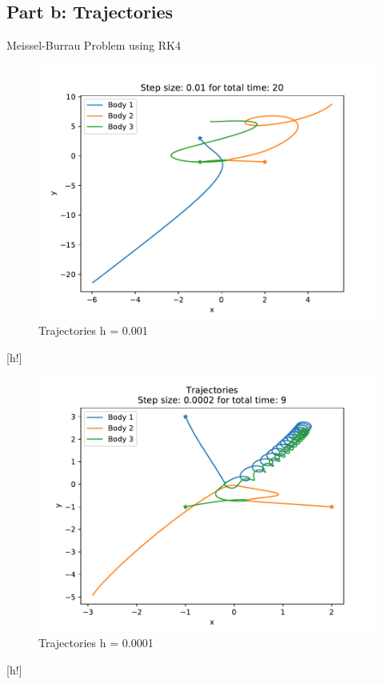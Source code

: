 \documentclass[12pt,a4paper,twoside]{article}
\begin{document}
\subsection*{Part b: Trajectories}
Meissel-Burrau Problem using RK4

\begin{figure}[h!]
  \centering
  \includegraphics[]{figs/exercise03_2_stepsize001_time20.pdf}
  \caption{Trajectories h = 0.001}
\end{figure}[h!]
\begin{figure}[h!]
  \centering
  \includegraphics[]{figs/exercise03_2_stepsize00002_time9.pdf}
  \caption{Trajectories h = 0.0001}
\end{figure}[h!]
\end{document}
